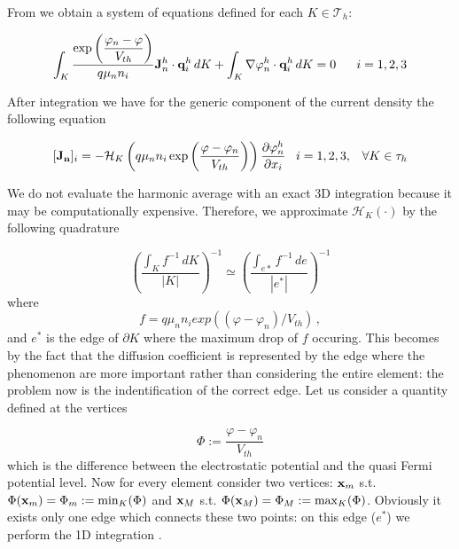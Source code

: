 From  we obtain a system of equations defined for each $K \in \mathcal{T}_h$:

\begin{equation}
\label{eq: variation form of current density}
\int_K \dfrac{ \exp \left( \dfrac{\varphi_n-\varphi}{V_{th}} \right) }{q \mu_n n_i} \vect{J}_n^h \cdot \vect{q}^h_i \, dK
 + \int_K \nabla \varphi_n^h \cdot \vect{q}^h_i \, dK = 0 \psp{10}  i=1,2,3
\end{equation}

After integration we have for the generic component of the current density the following equation

\begin{equation}
\label{eq: first formula for J}
[\vect{J_n}]_i = - \mathcal{H}_K \left( q \mu_n n_i \exp \left( \dfrac{\varphi-\varphi_n}{V_{th}} \right)  \right) \dfrac{\partial \varphi_n^h}{\partial x_i} \psp{5} i = 1,2,3, \psp{5} \forall K \in \tau_h
\end{equation}

We do not evaluate the harmonic average with an exact 3D integration because it may be computationally expensive. Therefore, we approximate $\mathcal{H}_K(\cdot)$ by the following quadrature

\begin{equation}
\label{eq: approzimation from 3D to edge}
\left(\dfrac{\int_K f^{-1} \, dK}{|K|} \right)^{-1} \simeq \left(\dfrac{\int_{e*} f^{-1} \, de}{|e^*|} \right)^{-1}
\end{equation}
 where 
\begin{equation*}
 f=q \mu_n n_i exp((\varphi-\varphi_n)/V_{th}) \, ,
\end{equation*} 
 and $e^*$ is the edge of $\partial K$ where the maximum drop of $f$ occuring.
This becomes by the fact that the diffusion coefficient is represented by the edge where the phenomenon are more important rather than considering the entire element: the problem now is the indentification of the correct edge. Let us consider a quantity defined at the vertices

\begin{equation}
\label{eq: differenza tra pot e qf}
\Phi := \dfrac{\varphi - 	\varphi_n}{V_{th}}
\end{equation}
which is the difference between the electrostatic potential and the quasi Fermi potential level. Now for every element consider two vertices: $\mathbf{x}_m$ s.t. $\Phi(\mathbf{x}_m)=\Phi_m := \min_K(\Phi)$ and $\mathbf{x}_M$ s.t. $\Phi(\mathbf{x}_M)=\Phi_M:=\max_K(\Phi)$. Obviously it exists only one edge which connects these two points: on this edge ($e^*$) we perform the 1D integration .

